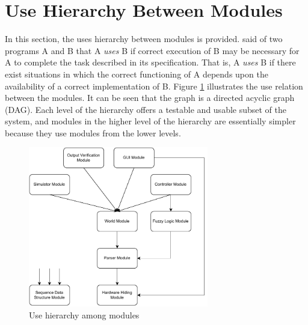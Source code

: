 \documentclass[12pt, titlepage]{article}
\begin{document}
\section{Use Hierarchy Between Modules} \label{SecUse}

In this section, the uses hierarchy between modules is
provided. \citet{Parnas1978} said of two programs A and B that A {\em uses} B if
correct execution of B may be necessary for A to complete the task described in
its specification. That is, A {\em uses} B if there exist situations in which
the correct functioning of A depends upon the availability of a correct
implementation of B.  Figure \ref{FigUH} illustrates the use relation between
the modules. It can be seen that the graph is a directed acyclic graph
(DAG). Each level of the hierarchy offers a testable and usable subset of the
system, and modules in the higher level of the hierarchy are essentially simpler
because they use modules from the lower levels.

\begin{figure}[H]
\centering
\includegraphics[width=0.7\textwidth]{Use hierarchy 2.pdf}
\caption{Use hierarchy among modules}
\label{FigUH}
\end{figure}



\end{document}
